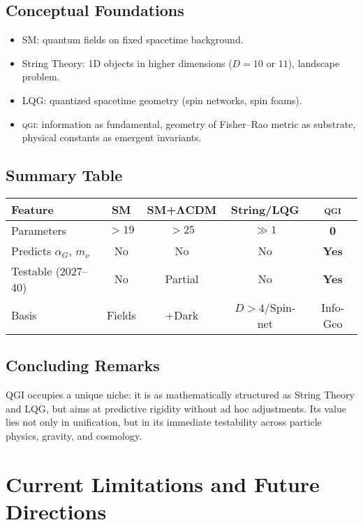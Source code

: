 \documentclass{article}
\numberwithin{equation}{section}
\theoremstyle{plain}
\theoremstyle{definition}
\theoremstyle{remark}
\newcommand{\qgi}{\textsc{qgi}}
\begin{document}
\subsection{Conceptual Foundations}
\begin{itemize}
    \item SM: quantum fields on fixed spacetime background.
    \item String Theory: 1D objects in higher dimensions ($D=10$ or $11$), landscape problem.
    \item LQG: quantized spacetime geometry (spin networks, spin foams).
    \item \qgi: information as fundamental, geometry of Fisher--Rao metric as substrate, physical constants as emergent invariants.
\end{itemize}

\subsection{Summary Table}
\begin{center}
\small
\begin{tabular}{@{}lcccc@{}}
\toprule
\textbf{Feature} & \textbf{SM} & \textbf{SM+ΛCDM} & \textbf{String/LQG} & \textbf{\qgi} \\
\midrule
Parameters & $>19$ & $>25$ & $\gg 1$ & \textbf{0} \\
Predicts $\alpha_G$, $m_\nu$ & No & No & No & \textbf{Yes} \\
Testable (2027--40) & No & Partial & No & \textbf{Yes} \\
Basis & Fields & +Dark & $D>4$/Spin-net & Info-Geo \\
\bottomrule
\end{tabular}
\normalsize
\end{center}

\subsection{Concluding Remarks}
QGI occupies a unique niche: it is as mathematically structured as String Theory and LQG, but aims at predictive rigidity without ad hoc adjustments. Its value lies not only in unification, but in its immediate testability across particle physics, gravity, and cosmology.


\section{Current Limitations and Future Directions}
\label{app:limits}
\end{document}
